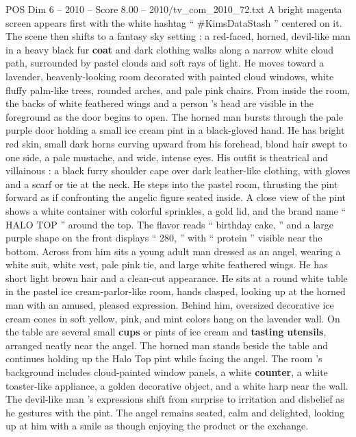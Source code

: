 \begin{textsample}{POS Dim 6 – 2010 – Score 8.00 – 2010/tv\_com\_2010\_72.txt}  \label{ex:f6_pos_083}
A bright magenta screen appears first with the white hashtag “ \#KimsDataStash ” centered on it.
The scene then shifts to a fantasy sky setting : a red-faced, horned, devil-like man in a heavy black fur \textbf{coat} and dark clothing walks along a narrow white cloud path, surrounded by pastel clouds and soft rays of light.
He moves toward a lavender, heavenly-looking room decorated with painted cloud windows, white fluffy palm-like trees, rounded arches, and pale pink chairs.
From inside the room, the backs of white feathered wings and a person ’s head are visible in the foreground as the door begins to open.
The horned man bursts through the pale purple door holding a small ice cream pint in a black-gloved hand.
He has bright red skin, small dark horns curving upward from his forehead, blond hair swept to one side, a pale mustache, and wide, intense eyes.
His outfit is theatrical and villainous : a black furry shoulder cape over dark leather-like clothing, with gloves and a scarf or tie at the neck.
He steps into the pastel room, thrusting the pint forward as if confronting the angelic figure seated inside.
A close view of the pint shows a white container with colorful sprinkles, a gold lid, and the brand name “ HALO TOP ” around the top.
The flavor reads “ birthday cake, ” and a large purple shape on the front displays “ 280, ” with “ protein ” visible near the bottom.
Across from him sits a young adult man dressed as an angel, wearing a white suit, white vest, pale pink tie, and large white feathered wings.
He has short light brown hair and a clean-cut appearance.
He sits at a round white table in the pastel ice cream-parlor-like room, hands clasped, looking up at the horned man with an amused, pleased expression.
Behind him, oversized decorative ice cream cones in soft yellow, pink, and mint colors hang on the lavender wall.
On the table are several small \textbf{cups} or pints of ice cream and \textbf{tasting} \textbf{utensils}, arranged neatly near the angel.
The horned man stands beside the table and continues holding up the Halo Top pint while facing the angel.
The room ’s background includes cloud-painted window panels, a white \textbf{counter}, a white toaster-like appliance, a golden decorative object, and a white harp near the wall.
The devil-like man ’s expressions shift from surprise to irritation and disbelief as he gestures with the pint.
The angel remains seated, calm and delighted, looking up at him with a smile as though enjoying the product or the exchange.

\end{textsample}
